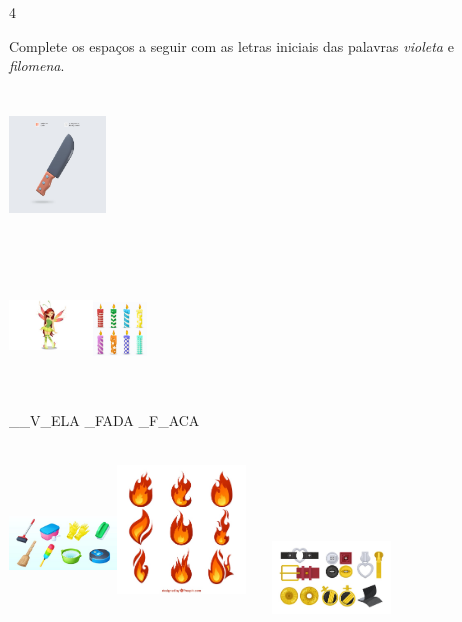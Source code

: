 {\num{4}\

Complete os espaços a seguir com as letras iniciais das palavras
\textit{violeta} e \textit{filomena}.


\includegraphics[width=1.01042in,height=1.55278in]{media/image7.jpeg}

\includegraphics[width=0.87500in,height=1.40486in]{media/image8.jpeg}\includegraphics[width=0.56250in,height=1.32083in]{media/image9.jpeg}

\_\_V\_ELA \_FADA \_F\_ACA

\includegraphics[width=1.12500in,height=1.48958in]{media/image10.jpeg}\includegraphics[width=1.34375in,height=1.77083in]{media/image11.jpeg}\includegraphics[width=1.77847in,height=0.76369in]{media/image12.jpeg}

}
